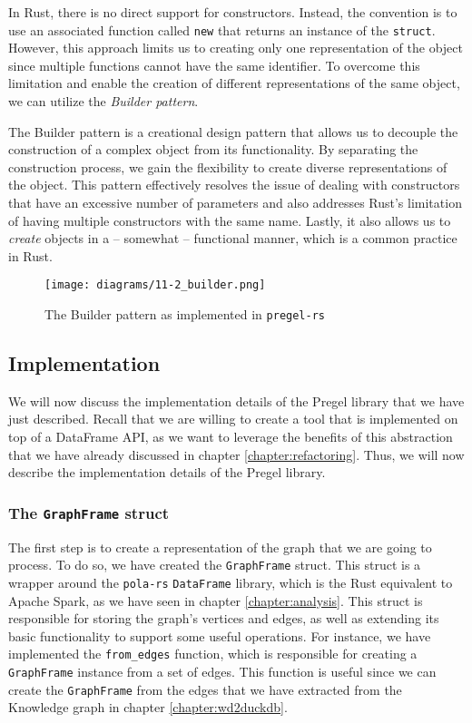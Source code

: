 In Rust, there is no direct support for constructors. Instead, the convention is to use an associated function called \texttt{new} that returns an instance of the \texttt{struct}. However, this approach limits us to creating only one representation of the object since multiple functions cannot have the same identifier. To overcome this limitation and enable the creation of different representations of the same object, we can utilize the \textit{Builder pattern}.

The Builder pattern is a creational design pattern that allows us to decouple the construction of a complex object from its functionality. By separating the construction process, we gain the flexibility to create diverse representations of the object. This pattern effectively resolves the issue of dealing with constructors that have an excessive number of parameters and also addresses Rust's limitation of having multiple constructors with the same name. Lastly, it also allows us to \textit{create} objects in a -- somewhat -- functional manner, which is a common practice in Rust.

\begin{figure}[ht]
    \centering
    \texttt{[image: diagrams/11-2\_builder.png]}
    \caption[The Builder pattern as implemented in \texttt{pregel-rs}]{The Builder pattern as implemented in \texttt{pregel-rs}\footnotemark}
\end{figure}

\subsection{Implementation}

We will now discuss the implementation details of the Pregel library that we have just described. Recall that we are willing to create a tool that is implemented on top of a DataFrame API, as we want to leverage the benefits of this abstraction that we have already discussed in chapter \ref{chapter:refactoring}. Thus, we will now describe the implementation details of the Pregel library.

\subsubsection{The \texttt{GraphFrame} struct}

The first step is to create a representation of the graph that we are going to process. To do so, we have created the \texttt{GraphFrame} struct. This struct is a wrapper around the \texttt{pola-rs} \texttt{DataFrame} library, which is the Rust equivalent to Apache Spark, as we have seen in chapter \ref{chapter:analysis}. This struct is responsible for storing the graph's vertices and edges, as well as extending its basic functionality to support some useful operations. For instance, we have implemented the \texttt{from\_edges} function, which is responsible for creating a \texttt{GraphFrame} instance from a set of edges. This function is useful since we can create the \texttt{GraphFrame} from the edges that we have extracted from the Knowledge graph in chapter \ref{chapter:wd2duckdb}.

